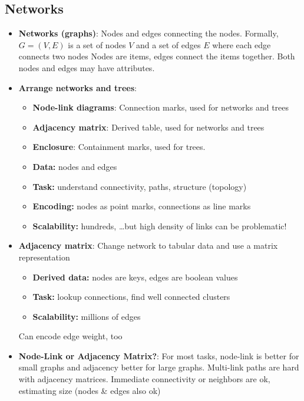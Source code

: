 \documentclass{report}
\begin{document}
    \subsection{Networks}
    \begin{itemize}
        \item \textbf{Networks (graphs)}: Nodes and edges connecting the nodes. Formally, $G = (V,E)$ is a set of nodes $V$ and a set of edges $E$ where each edge connects two nodes
            \bigbreak \noindent 
            Nodes are items, edges connect the items together. Both nodes and edges may have attributes.
        \item \textbf{Arrange networks and trees}: 
            \begin{itemize}
                \item \textbf{Node-link diagrams}: Connection marks, used for networks and trees
                \item \textbf{Adjacency matrix}: Derived table, used for networks and trees
                \item \textbf{Enclosure}: Containment marks, used for trees.
            \end{itemize}
            \bigbreak \noindent 
            \begin{itemize}
                \item \textbf{Data:} nodes and edges 
                \item \textbf{Task:} understand connectivity, paths, structure (topology)
                \item \textbf{Encoding:} nodes as point marks, connections as line marks
                \item \textbf{Scalability:} hundreds, …but high density of links can be problematic! 
            \end{itemize}
        \item \textbf{Adjacency matrix}: Change network to tabular data and use a matrix representation 
            \begin{itemize}
                \item \textbf{Derived data:} nodes are keys, edges are boolean values
                \item \textbf{Task:} lookup connections, find well connected clusters
                \item \textbf{Scalability:} millions of edges
            \end{itemize}
            Can encode edge weight, too
        \item \textbf{Node-Link or Adjacency Matrix?}: For most tasks, node-link is better for small graphs and adjacency better for large graphs. Multi-link paths are hard with adjacency matrices. Immediate connectivity or neighbors are ok, estimating size (nodes & edges also ok) 

\end{itemize}
\end{document}
